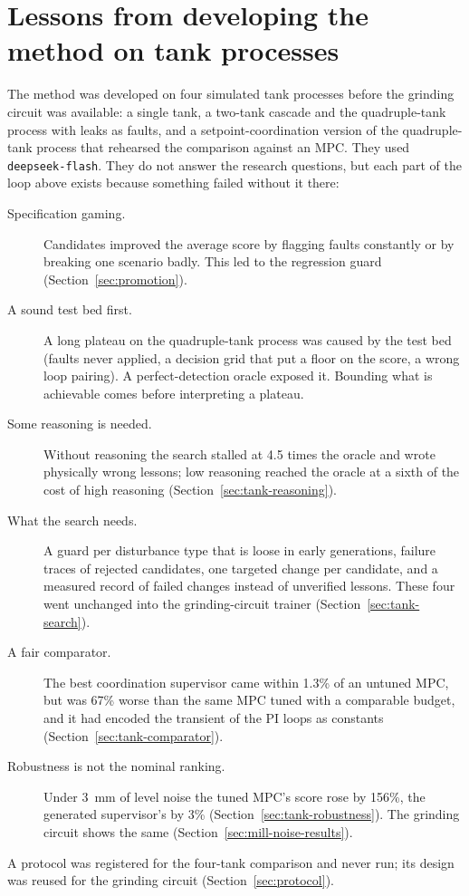 \section{Lessons from developing the method on tank processes}
\label{sec:dev-lessons}
The method was developed on four simulated tank processes before the grinding
circuit was available: a single tank, a two-tank cascade and the
quadruple-tank process \cite{johansson2000,bloor2024pcgym} with leaks as
faults, and a setpoint-coordination version of the quadruple-tank process that
rehearsed the comparison against an MPC. They used \texttt{deepseek-flash}.
They do not answer the research questions, but each part of the loop above
exists because something failed without it there:
\begin{description}
\item[Specification gaming.] Candidates improved the average score by
  flagging faults constantly or by breaking one scenario badly. This led to
  the regression guard (Section~\ref{sec:promotion}).
\item[A sound test bed first.] A long plateau on the quadruple-tank process
  was caused by the test bed (faults never applied, a decision grid that put a
  floor on the score, a wrong loop pairing). A perfect-detection oracle exposed
  it. Bounding what is achievable comes before interpreting a plateau.
\item[Some reasoning is needed.] Without reasoning the search stalled at 4.5
  times the oracle and wrote physically wrong lessons; low reasoning reached
  the oracle at a sixth of the cost of high reasoning
  (Section~\ref{sec:tank-reasoning}).
\item[What the search needs.] A guard per disturbance type that is loose in
  early generations, failure traces of rejected candidates, one targeted change
  per candidate, and a measured record of failed changes instead of
  unverified lessons. These four went unchanged into the grinding-circuit
  trainer (Section~\ref{sec:tank-search}).
\item[A fair comparator.] The best coordination supervisor came within 1.3\%
  of an untuned MPC, but was 67\% worse than the same MPC tuned with a
  comparable budget, and it had encoded the transient of the PI loops as
  constants (Section~\ref{sec:tank-comparator}).
\item[Robustness is not the nominal ranking.] Under 3~mm of level noise the
  tuned MPC's score rose by 156\%, the generated supervisor's by 3\%
  (Section~\ref{sec:tank-robustness}). The grinding circuit shows the same
  (Section~\ref{sec:mill-noise-results}).
\end{description}
A protocol was registered for the four-tank comparison and never run; its
design was reused for the grinding circuit (Section~\ref{sec:protocol}).


